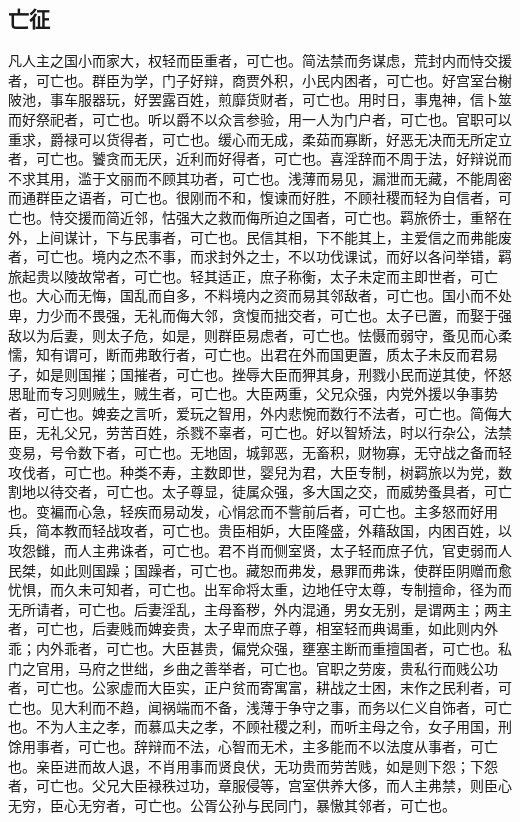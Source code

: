 \documentclass[]{article}
\begin{document}
\hypertarget{header-n911}{%
\subsection{亡征}\label{header-n911}}

凡人主之国小而家大，权轻而臣重者，可亡也。简法禁而务谋虑，荒封内而恃交援者，可亡也。群臣为学，门子好辩，商贾外积，小民内困者，可亡也。好宫室台榭陂池，事车服器玩，好罢露百姓，煎靡货财者，可亡也。用时日，事鬼神，信卜筮而好祭祀者，可亡也。听以爵不以众言参验，用一人为门户者，可亡也。官职可以重求，爵禄可以货得者，可亡也。缓心而无成，柔茹而寡断，好恶无决而无所定立者，可亡也。饕贪而无厌，近利而好得者，可亡也。喜淫辞而不周于法，好辩说而不求其用，滥于文丽而不顾其功者，可亡也。浅薄而易见，漏泄而无藏，不能周密而通群臣之语者，可亡也。很刚而不和，愎谏而好胜，不顾社稷而轻为自信者，可亡也。恃交援而简近邻，怙强大之救而侮所迫之国者，可亡也。羁旅侨士，重帑在外，上间谋计，下与民事者，可亡也。民信其相，下不能其上，主爱信之而弗能废者，可亡也。境内之杰不事，而求封外之士，不以功伐课试，而好以各问举错，羁旅起贵以陵故常者，可亡也。轻其适正，庶子称衡，太子未定而主即世者，可亡也。大心而无悔，国乱而自多，不料境内之资而易其邻敌者，可亡也。国小而不处卑，力少而不畏强，无礼而侮大邻，贪愎而拙交者，可亡也。太子已置，而娶于强敌以为后妻，则太子危，如是，则群臣易虑者，可亡也。怯慑而弱守，蚤见而心柔懦，知有谓可，断而弗敢行者，可亡也。出君在外而国更置，质太子未反而君易子，如是则国摧；国摧者，可亡也。挫辱大臣而狎其身，刑戮小民而逆其使，怀怒思耻而专习则贼生，贼生者，可亡也。大臣两重，父兄众强，内党外援以争事势者，可亡也。婢妾之言听，爱玩之智用，外内悲惋而数行不法者，可亡也。简侮大臣，无礼父兄，劳苦百姓，杀戮不辜者，可亡也。好以智矫法，时以行杂公，法禁变易，号令数下者，可亡也。无地固，城郭恶，无畜积，财物寡，无守战之备而轻攻伐者，可亡也。种类不寿，主数即世，婴兒为君，大臣专制，树羁旅以为党，数割地以待交者，可亡也。太子尊显，徒属众强，多大国之交，而威势蚤具者，可亡也。变褊而心急，轻疾而易动发，心悁忿而不訾前后者，可亡也。主多怒而好用兵，简本教而轻战攻者，可亡也。贵臣相妒，大臣隆盛，外藉敌国，内困百姓，以攻怨雠，而人主弗诛者，可亡也。君不肖而侧室贤，太子轻而庶子伉，官吏弱而人民桀，如此则国躁；国躁者，可亡也。藏恕而弗发，悬罪而弗诛，使群臣阴赠而愈忧惧，而久未可知者，可亡也。出军命将太重，边地任守太尊，专制擅命，径为而无所请者，可亡也。后妻淫乱，主母畜秽，外内混通，男女无别，是谓两主；两主者，可亡也，后妻贱而婢妾贵，太子卑而庶子尊，相室轻而典谒重，如此则内外乖；内外乖者，可亡也。大臣甚贵，偏党众强，壅塞主断而重擅国者，可亡也。私门之官用，马府之世绌，乡曲之善举者，可亡也。官职之劳废，贵私行而贱公功者，可亡也。公家虚而大臣实，正户贫而寄寓富，耕战之士困，末作之民利者，可亡也。见大利而不趋，闻祸端而不备，浅薄于争守之事，而务以仁义自饰者，可亡也。不为人主之孝，而慕瓜夫之孝，不顾社稷之利，而听主母之令，女子用国，刑馀用事者，可亡也。辞辩而不法，心智而无术，主多能而不以法度从事者，可亡也。亲臣进而故人退，不肖用事而贤良伏，无功贵而劳苦贱，如是则下怨；下怨者，可亡也。父兄大臣禄秩过功，章服侵等，宫室供养大侈，而人主弗禁，则臣心无穷，臣心无穷者，可亡也。公胥公孙与民同门，暴慠其邻者，可亡也。
\end{document}
